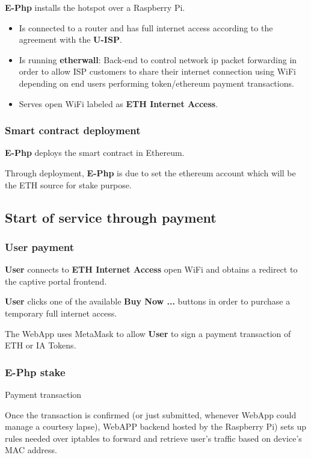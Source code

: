 \documentclass[12pt]{report}
\begin{document}
  \textbf{E-Php} installs the hotspot over a Raspberry Pi.

  \begin{itemize}
    \item Is connected to a router and has full internet access according to the agreement with the \textbf{U-ISP}.
    \item Is running \textbf{etherwall}: Back-end to control network ip packet forwarding in order to allow ISP customers to share their internet connection using WiFi depending on end users performing token/ethereum payment transactions.
    \item Serves open WiFi labeled as \textbf{ETH Internet Access}.
  \end{itemize}

  \subsubsection{Smart contract deployment}

  \textbf{E-Php} deploys the smart contract in Ethereum.

  Through deployment, \textbf{E-Php} is due to set the ethereum account which will be the ETH source for stake purpose.

  \subsection{Start of service through payment}


  \subsubsection{User payment}

  \textbf{User} connects to \textbf{ETH Internet Access} open WiFi and obtains a redirect to the captive portal frontend.

  \textbf{User} clicks one of the available \textbf{Buy Now ...} buttons in order to purchase a temporary full internet access.

  The WebApp uses MetaMask to allow \textbf{User} to sign a payment transaction of ETH or IA Tokens.

  \subsubsection{\textbf{E-Php} stake}

  Payment transaction

  Once the transaction is confirmed (or just submitted, whenever WebApp could manage a courtesy lapse), WebAPP backend hosted by the Raspberry Pi) sets up rules needed over iptables to forward and retrieve user's traffic based on device's MAC address.
\end{document}
